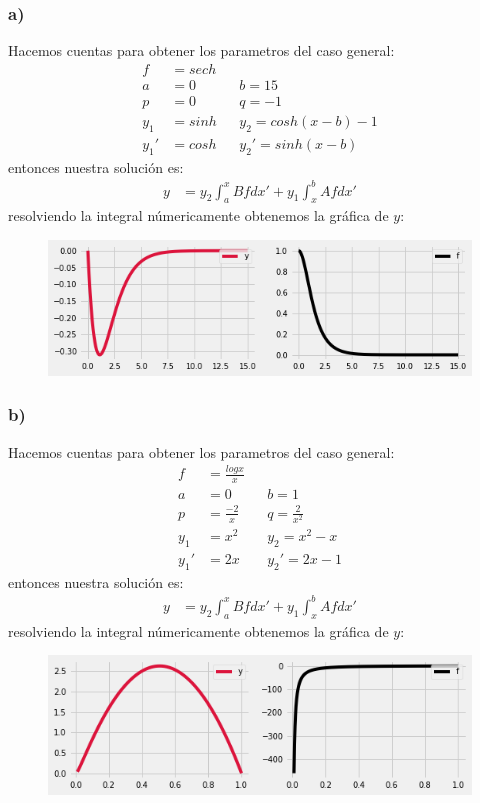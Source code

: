\documentclass{article}
\begin{document}
\begin{tcolorbox}[breakable]
    \subsubsection*{a)}
    Hacemos cuentas para obtener los parametros del caso general:
    \begin{align*}
        f&= sech \\
        a&=0 &&b=15 \\
        p&=0 &&q=-1 \\
        y_1 &= sinh  &&y_2= cosh(x-b)-1 \\
        y_1' &= cosh &&y_2'=sinh(x-b)
    \end{align*}
    entonces nuestra solución es:
    \begin{align*}
        y &=  y_2\int_{a}^x Bf dx' + y_1\int_{x}^b Afdx' 
    \end{align*}
    resolviendo la integral númericamente obtenemos la gráfica de $y$:
    \begin{figure}[H]
        \centering
        \includegraphics[scale=0.7]{images/p3_1.png}
    \end{figure}

    \subsubsection*{b)}
    Hacemos cuentas para obtener los parametros del caso general:
    \begin{align*}
        f&= \frac{logx}{x} \\
        a&=0 &&b=1 \\
        p&=\frac{-2}{x} &&q= \frac{2}{x^2} \\
        y_1 &= x^2  &&y_2= x^2-x \\
        y_1' &= 2x &&y_2'= 2x-1 
    \end{align*}
    entonces nuestra solución es:
    \begin{align*}
        y &=  y_2\int_{a}^x Bf dx' + y_1\int_{x}^b Afdx' 
    \end{align*}
    resolviendo la integral númericamente obtenemos la gráfica de $y$:
    \begin{figure}[H]
        \centering
        \includegraphics[scale=0.7]{images/p3_2.png}
    \end{figure}


\end{tcolorbox}
\end{document}
